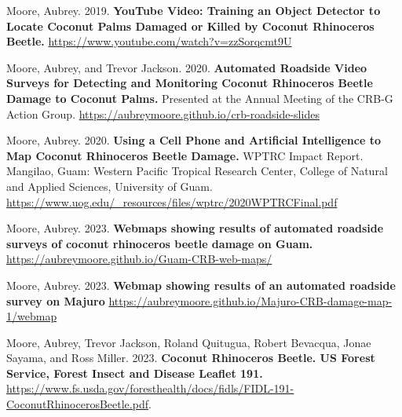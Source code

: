 \documentclass[12pt,english]{simplecv}
\begin{document}
\begin{thebibliography}{10}	

\bibitem{} Moore, Aubrey. 2019. \textbf{YouTube Video: Training an Object Detector to Locate Coconut Palms Damaged or Killed by Coconut Rhinoceros Beetle.} \url{https://www.youtube.com/watch?v=zzSorqcmt9U}

\bibitem{} Moore, Aubrey, and Trevor Jackson. 2020. \textbf{Automated Roadside Video Surveys for Detecting and Monitoring Coconut Rhinoceros Beetle Damage to Coconut Palms.} Presented at the Annual Meeting of the CRB-G Action Group. \url{https://aubreymoore.github.io/crb-roadside-slides}

\bibitem{} Moore, Aubrey. 2020. \textbf{Using a Cell Phone and Artificial Intelligence to Map Coconut Rhinoceros Beetle Damage.} WPTRC Impact Report. Mangilao, Guam: Western Pacific Tropical Research Center, College of Natural and Applied Sciences, University of Guam. \url{https://www.uog.edu/_resources/files/wptrc/2020WPTRCFinal.pdf}

\bibitem{} Moore, Aubrey. 2023. \textbf{Webmaps showing results of automated roadside surveys of coconut rhinoceros beetle damage on Guam.} \url{https://aubreymoore.github.io/Guam-CRB-web-maps/}

\bibitem{} Moore, Aubrey. 2023. \textbf{Webmap showing results of an automated roadside survey on Majuro} \url{https://aubreymoore.github.io/Majuro-CRB-damage-map-1/webmap}

\bibitem{} Moore, Aubrey, Trevor Jackson, Roland Quitugua, Robert Bevacqua, Jonae Sayama, and Ross Miller. 2023. \textbf{Coconut Rhinoceros Beetle. US Forest Service, Forest Insect and Disease Leaflet 191.} \url{https://www.fs.usda.gov/foresthealth/docs/fidls/FIDL-191-CoconutRhinocerosBeetle.pdf}.


\end{thebibliography}
\end{document}
